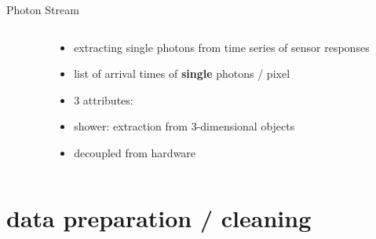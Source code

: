 \begin{frame}{Photon Stream}
\begin{columns}[onlytextwidth]
\begin{column}{0.475\textwidth}
\begin{overprint}
    \end{overprint}
      \end{column}
      \begin{column}{0.475\textwidth}
        \begin{itemize}
            \item extracting single photons from time series of sensor responses
            \item list of arrival times of \textbf{single} photons / pixel
            \item 3 attributes:
            \item shower: extraction from 3-dimensional objects
            \item decoupled from hardware
        \end{itemize}
      \end{column}
  \end{columns}
  \vspace{.5cm}

\end{frame}

\section{data preparation / cleaning}


